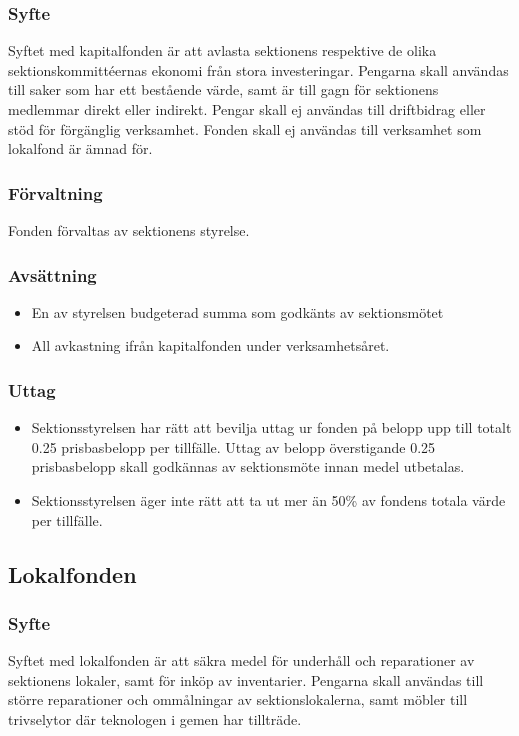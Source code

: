 \documentclass[a4paper, 10pt]{article}
\def\roundandprint #1{\xinttheiexpr #1\relax }
\newcommand{\prisbasbelopp}[1]{
    #1 prisbasbelopp
    \ifdef{\nuvarandeprisbasbelopp}{
        \marginpar{
            \small{ \textbf{\roundandprint{\xintiexpr#1 * \nuvarandeprisbasbelopp\relax}kr}}
        }
    }{}
}
\begin{document}
\subsubsection{Syfte}
\label{sec:kapitalfond_syfte}
Syftet med kapitalfonden är att avlasta sektionens respektive de olika sektionskommittéernas ekonomi från stora investeringar. Pengarna skall användas till saker som har ett bestående värde, samt är till gagn för sektionens medlemmar direkt eller indirekt. Pengar skall ej användas till driftbidrag eller stöd för förgänglig verksamhet. Fonden skall ej användas till verksamhet som lokalfond är ämnad för.
\subsubsection{Förvaltning}
Fonden förvaltas av sektionens styrelse.
\subsubsection{Avsättning}
\begin{itemize}
\item En av styrelsen budgeterad summa som godkänts av sektionsmötet
\item All avkastning ifrån kapitalfonden under verksamhetsåret.
\end{itemize}
\subsubsection{Uttag}
\begin{itemize}
\item Sektionsstyrelsen har rätt att bevilja uttag ur fonden på belopp upp till totalt \prisbasbelopp{0.25} per tillfälle. Uttag av belopp överstigande \prisbasbelopp{0.25} skall godkännas av sektionsmöte innan medel utbetalas.
\item Sektionsstyrelsen äger inte rätt att ta ut mer än 50\% av fondens totala värde per tillfälle.
\end{itemize}

\subsection{Lokalfonden}
\subsubsection{Syfte}
\label{sec:lokalfond_syfte}
Syftet med lokalfonden är att säkra medel för underhåll och reparationer av sektionens lokaler, samt för inköp av inventarier. Pengarna skall användas till större reparationer och ommålningar av sektionslokalerna, samt möbler till trivselytor där teknologen i gemen har tillträde.
\end{document}

